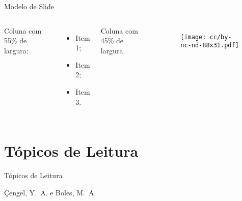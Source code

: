     \begin{frame}{Modelo de Slide}\vspace*{-2em}
        \begin{columns}
            Coluna com 55\% de largura:\\[\smallskipamount]
            \begin{itemize}
                \item<1-> Item 1;
                \item<2-> Item 2;
                \item<3-> Item 3.
            \end{itemize}
            Coluna com 45\% de largura.
            \begin{figure}
                \texttt{[image: cc/by-nc-nd-88x31.pdf]}
            \end{figure}
        \end{columns}
    \end{frame}

\section{Tópicos de Leitura}

    \begin{frame}[allowframebreaks]{Tópicos de Leitura}
        \begin{thebibliography}{Çengel, Y.~A., 2013}
                Çengel, Y.~A. e Boles, M.~A.
        \end{thebibliography}
    \end{frame}




